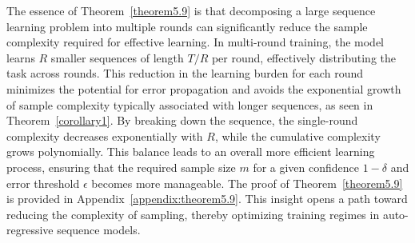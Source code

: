 
The essence of Theorem~\ref{theorem5.9} is that decomposing a large sequence learning problem into multiple rounds can significantly reduce the sample complexity required for effective learning. In multi-round training, the model learns \(R\) smaller sequences of length \(T/R\) per round, effectively distributing the task across rounds. This reduction in the learning burden for each round minimizes the potential for error propagation and avoids the exponential growth of sample complexity typically associated with longer sequences, as seen in Theorem~\ref{corollary1}. By breaking down the sequence, the single-round complexity decreases exponentially with \(R\), while the cumulative complexity grows polynomially. 
This balance leads to an overall more efficient learning process, ensuring that the required sample size \(m\) for a given confidence \(1 - \delta\) and error threshold \( \epsilon \) becomes more manageable. The proof of Theorem~\ref{theorem5.9} is provided in Appendix~\ref{appendix:theorem5.9}.
This insight opens a path toward reducing the complexity of sampling, thereby optimizing training regimes in auto-regressive sequence models.